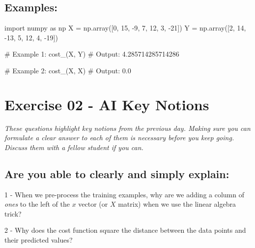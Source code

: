 \documentclass[]{article}
\newenvironment{Shaded}{\begin{snugshade}}{\end{snugshade}}
\newcommand{\CommentTok}[1]{\textcolor[rgb]{0.48,0.49,0.49}{#1}}
\newcommand{\DecValTok}[1]{\textcolor[rgb]{0.96,0.45,0.00}{#1}}
\newcommand{\FloatTok}[1]{\textcolor[rgb]{0.96,0.45,0.00}{#1}}
\newcommand{\ImportTok}[1]{\textcolor[rgb]{0.15,0.68,0.38}{#1}}
\newcommand{\NormalTok}[1]{\textcolor[rgb]{0.81,0.81,0.76}{#1}}
\newcommand{\OperatorTok}[1]{\textcolor[rgb]{0.81,0.81,0.76}{#1}}
\begin{document}
\hypertarget{examples-1}{%
\subsection{Examples:}\label{examples-1}}

\begin{Shaded}
\begin{Highlighting}[]
\ImportTok{import}\NormalTok{ numpy }\ImportTok{as}\NormalTok{ np}
\NormalTok{X }\OperatorTok{=}\NormalTok{ np.array([}\DecValTok{0}\NormalTok{, }\DecValTok{15}\NormalTok{, }\DecValTok{-9}\NormalTok{, }\DecValTok{7}\NormalTok{, }\DecValTok{12}\NormalTok{, }\DecValTok{3}\NormalTok{, }\DecValTok{-21}\NormalTok{])}
\NormalTok{Y }\OperatorTok{=}\NormalTok{ np.array([}\DecValTok{2}\NormalTok{, }\DecValTok{14}\NormalTok{, }\DecValTok{-13}\NormalTok{, }\DecValTok{5}\NormalTok{, }\DecValTok{12}\NormalTok{, }\DecValTok{4}\NormalTok{, }\DecValTok{-19}\NormalTok{])}

\CommentTok{# Example 1:}
\NormalTok{cost_(X, Y)}
\CommentTok{# Output:}
\FloatTok{4.285714285714286}

\CommentTok{# Example 2:}
\NormalTok{cost_(X, X)}
\CommentTok{# Output:}
\FloatTok{0.0}
\end{Highlighting}
\end{Shaded}

\clearpage

\hypertarget{exercise-02---ai-key-notions-1}{%
\section{Exercise 02 - AI Key
Notions}\label{exercise-02---ai-key-notions-1}}

\emph{These questions highlight key notions from the previous day.
Making sure you can formulate a clear answer to each of them is
necessary before you keep going. Discuss them with a fellow student if
you can.}

\hypertarget{are-you-able-to-clearly-and-simply-explain}{%
\subsection{Are you able to clearly and simply
explain:}\label{are-you-able-to-clearly-and-simply-explain}}

1 - When we pre-process the training examples, why are we adding a
column of \emph{ones} to the left of the \(x\) vector (or \(X\) matrix)
when we use the linear algebra trick?

2 - Why does the cost function square the distance between the data
points and their predicted values?
\end{document}
